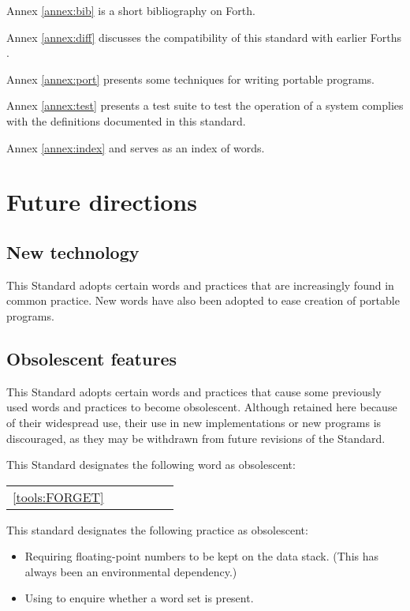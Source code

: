 Annex \ref{annex:bib} is a short bibliography on Forth.


Annex \ref{annex:diff} discusses the compatibility of this standard
with earlier Forths%
.

Annex \ref{annex:port} presents some techniques for writing portable
programs.

\ifrelease\else
Annex \ref{annex:test} presents a test suite to test the operation
of a system complies with the definitions documented in this
standard.
\fi

Annex \ref{annex:index}
and serves as an index of words.

\section{Future directions}

\subsection{New technology}

This Standard adopts certain words and practices that are
increasingly found in common practice. New words have also
been adopted to ease creation of portable programs.

\subsection{Obsolescent features}
\label{intro:obsoleat}

This Standard adopts certain words and practices that cause
some previously used words and practices to become obsolescent.
Although retained here because of their widespread use, their
use in new implementations or new programs is discouraged,
as they may be withdrawn from future revisions of the Standard.

This Standard designates the following word as obsolescent:

\begin{tabular}{rl@{\qquad}rl@{\qquad}rl}
	\ref{tools:FORGET}	& \word[tools]{FORGET}	\\
\end{tabular}

This standard designates the following practice as obsolescent:

\begin{itemize}
\item Requiring floating-point numbers to be kept on the data stack.
	(This has always been an environmental dependency.)

\item Using  to enquire whether a word set is present.
\end{itemize}
